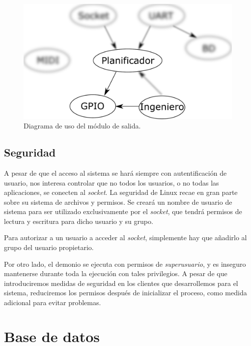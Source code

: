 \begin{figure}[H]
	\noindent \begin{centering}
		\includegraphics[width=\linewidth/2]{capitulo4/daemon_gpio}
		\par\end{centering}
	\smallskip
	\caption{\label{fig:daemon_gpio} Diagrama de uso del módulo de salida.}
\end{figure} 

\smallskip

\subsection{Seguridad}

A pesar de que el acceso al sistema se hará siempre con autentificación de usuario, nos interesa controlar que no todos los usuarios, o no todas las aplicaciones, se conecten al \textit{socket}. La seguridad de Linux recae en gran parte sobre su sistema de archivos y permisos. Se creará un nombre de usuario de sistema para ser utilizado exclusivamente por el \textit{socket}, que tendrá permisos de lectura y escritura para dicho usuario y su grupo.

Para autorizar a un usuario a acceder al \textit{socket}, simplemente hay que añadirlo al grupo del usuario propietario.

Por otro lado, el demonio se ejecuta con permisos de \textit{superusuario}, y es inseguro mantenerse durante toda la ejecución con tales privilegios. A pesar de que introduciremos medidas de seguridad en los clientes que desarrollemos para el sistema, reduciremos los permisos después de inicializar el proceso, como medida adicional para evitar problemas.

\section{Base de datos}
\label{sec:database}

